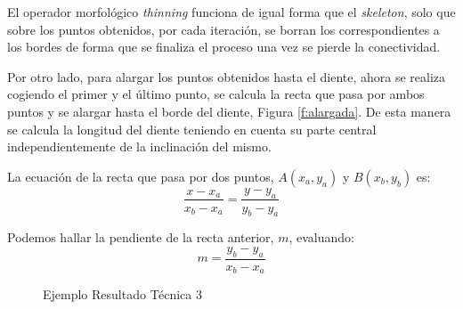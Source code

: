 El operador morfológico \emph{thinning} funciona de igual forma que el \emph{skeleton}, solo que sobre los puntos obtenidos, por cada iteración, se borran los correspondientes a los bordes de forma que se finaliza el proceso una vez se pierde la conectividad.

Por otro lado, para alargar los puntos obtenidos hasta el diente, ahora se realiza cogiendo el primer y el último punto, se calcula la recta que pasa por ambos puntos y se alargar hasta el borde del diente, Figura \ref{f:alargada}. De esta manera se calcula la longitud del diente teniendo en cuenta su parte central independientemente de la inclinación del mismo.

La ecuación de la recta que pasa por dos puntos, $A(x_a,y_a)$ y $B(x_b,y_b)$ es:
$$\frac{x-x_a}{x_b-x_a}=\frac{y-y_a}{y_b-y_a}$$

Podemos hallar la pendiente de la recta anterior, $m$, evaluando:
$$m=\frac{y_b-y_a}{x_b-x_a}$$

\begin{figure}[h]
 \centering
 \caption{Ejemplo Resultado Técnica 3}
 \label{f:ejemplo3}
\end{figure}

